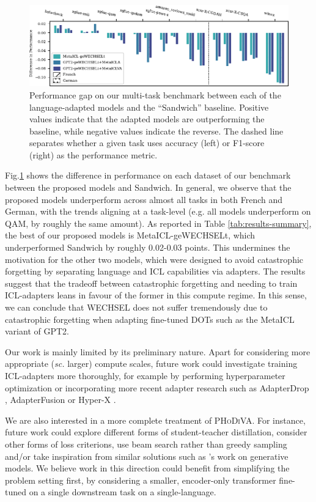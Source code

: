 \documentclass[11pt]{article}
\begin{document}
\begin{figure}[ht]
	\includegraphics{results.pdf}
	\caption{Performance gap on our multi-task benchmark between each of the language-adapted models
		and the ``Sandwich'' baseline. Positive values indicate that the adapted models are
		outperforming the baseline, while negative values indicate the reverse. The dashed line
		separates whether a given task uses accuracy (left) or F1-score (right) as the performance
		metric.}
	\label{fig:results}
\end{figure}

Fig.\@ \ref{fig:results} shows the difference in performance on each dataset of our benchmark
between the proposed models and Sandwich. In general, we observe that the proposed models
underperform across almost all tasks in both French and German, with the trends aligning at
a task-level (e.g. all models underperform on QAM, by roughly the same amount). As reported in Table
\ref{tab:results-summary}, the best of our proposed models is MetaICL-geWECHSELt, which
underperformed Sandwich by roughly 0.02-0.03 points. This undermines the motivation for the other
two models, which were designed to avoid catastrophic forgetting by separating language and ICL
capabilities via adapters. The results suggest that the tradeoff between catastrophic forgetting and
needing to train ICL-adapters leans in favour of the former in this compute regime. In this sense,
we can conclude that WECHSEL does not suffer tremendously due to catastrophic forgetting when
adapting fine-tuned DOTs such as the MetaICL variant of GPT2.

Our work is mainly limited by its preliminary nature. Apart for considering more appropriate
(\textit{sc.} larger) compute scales, future work could investigate training ICL-adapters more
thoroughly, for example by performing hyperparameter optimization or incorporating more recent
adapter research such as AdapterDrop \citep{ruckle_adapterdrop_2021}, AdapterFusion
\citep{pfeiffer_adapterfusion_2021} or Hyper-X \citep{ustun_hyper-x_2022}.

We are also interested in a more complete treatment of \textsc{PHoDiVA}. For instance, future work
could explore different forms of student-teacher distillation, consider other forms of loss
criterions, use beam search rather than greedy sampling and/or take inspiration from similar
solutions such as \citet{khrulkov_disentangled_2021}'s work on generative models. We believe work in
this direction could benefit from simplifying the problem setting first, by considering a smaller,
encoder-only transformer fine-tuned on a single downstream task on a single-language.
\end{document}

